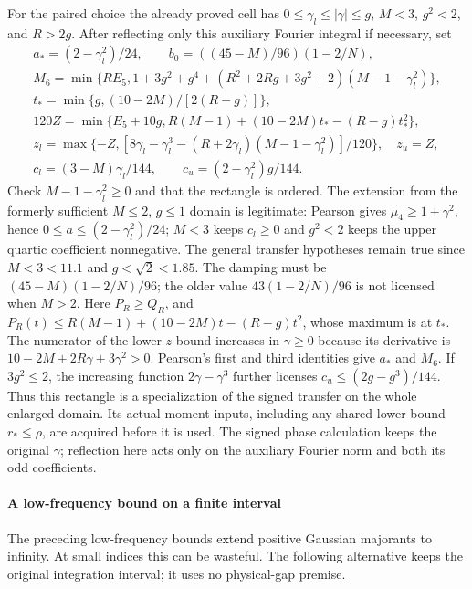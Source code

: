 For the paired choice the already proved cell has
$0\le\gamma_l\le|\gamma|\le g$, $M<3$, $g^2<2$, and $R>2g$. After reflecting only this auxiliary Fourier integral if necessary, set
\begin{gather*}
 a_*=(2-\gamma_l^2)/24,\qquad b_0=((45-M)/96)(1-2/N),\\
 M_6=\min\{RE_5,1+3g^2+g^4+(R^2+2Rg+3g^2+2)(M-1-\gamma_l^2)\},\\
 t_*=\min\{g,(10-2M)/[2(R-g)]\},\\
 120Z=\min\{E_5+10g,R(M-1)+(10-2M)t_*-(R-g)t_*^2\},\\
 z_l=\max\{-Z,[8\gamma_l-\gamma_l^3-(R+2\gamma_l)(M-1-\gamma_l^2)]/120\},
 \quad z_u=Z,\\
 c_l=(3-M)\gamma_l/144,\qquad c_u=(2-\gamma_l^2)g/144.
\end{gather*}
Check $M-1-\gamma_l^2\ge0$ and that the rectangle is ordered.
The extension from the formerly sufficient $M\le2$, $g\le1$ domain is
legitimate: Pearson gives $\mu_4\ge1+\gamma^2$, hence
$0\le a\le(2-\gamma_l^2)/24$; $M<3$ keeps $c_l\ge0$ and $g^2<2$
keeps the upper quartic coefficient nonnegative. The general transfer
hypotheses remain true since $M<3<11.1$ and $g<\sqrt2<1.85$.
The damping must be $(45-M)(1-2/N)/96$; the older value
$43(1-2/N)/96$ is not licensed when $M>2$. Here
$P_R\ge Q_R$, and $P_R(t)\le R(M-1)+(10-2M)t-(R-g)t^2$,
whose maximum is at $t_*$. The numerator of the lower $z$ bound increases
in $\gamma\ge0$ because its derivative is
$10-2M+2R\gamma+3\gamma^2>0$. Pearson's first and third identities
give $a_*$ and $M_6$. If $3g^2\le2$, the increasing function
$2\gamma-\gamma^3$ further licenses $c_u\le(2g-g^3)/144$.
Thus this rectangle is a specialization of the signed transfer on the
whole enlarged domain. Its actual moment inputs, including any shared
lower bound $r_*\le\rho$, are acquired before it is used. The signed
phase calculation keeps the original $\gamma$; reflection here acts only
on the auxiliary Fourier norm and both its odd coefficients.

\paragraph{A low-frequency bound on a finite interval}
\label{ms:fourier:rescore:sec:finite-low}

The preceding low-frequency bounds extend positive Gaussian majorants to infinity.
At small indices this can be wasteful. The following alternative keeps
the original integration interval; it uses no physical-gap premise.

